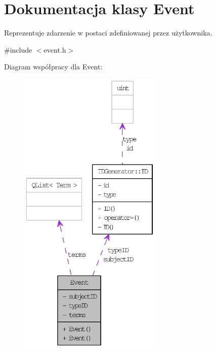 \hypertarget{classEvent}{
\section{Dokumentacja klasy Event}
\label{classEvent}
}


Reprezentuje zdarzenie w postaci zdefiniowanej przez użytkownika.  




{\ttfamily \#include $<$event.h$>$}



Diagram współpracy dla Event:\nopagebreak
\begin{figure}[H]
\begin{center}
\leavevmode
\includegraphics[height=400pt]{classEvent__coll__graph}
\end{center}
\end{figure}
